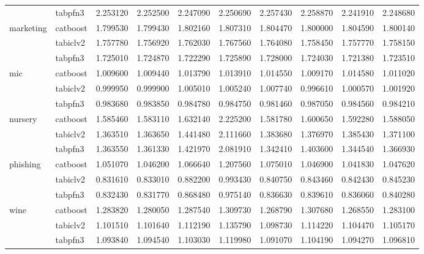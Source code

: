 \begin{table}
\begin{tabular}{llrrrrrrrr}
 & tabpfn3 & 2.253120 & 2.252500 & 2.247090 & 2.250690 & 2.257430 & 2.258870 & 2.241910 & 2.248680 \\
\cline{1-10}
\multirow[t]{3}{*}{marketing} & catboost & 1.799530 & 1.799430 & 1.802160 & 1.807310 & 1.804470 & 1.800000 & 1.804590 & 1.800140 \\
 & tabiclv2 & 1.757780 & 1.756920 & 1.762030 & 1.767560 & 1.764080 & 1.758450 & 1.757770 & 1.758150 \\
 & tabpfn3 & 1.725010 & 1.724870 & 1.722290 & 1.725890 & 1.728000 & 1.724030 & 1.721380 & 1.723510 \\
\cline{1-10}
\multirow[t]{3}{*}{mic} & catboost & 1.009600 & 1.009440 & 1.013790 & 1.013910 & 1.014550 & 1.009170 & 1.014580 & 1.011020 \\
 & tabiclv2 & 0.999950 & 0.999900 & 1.005010 & 1.005240 & 1.007740 & 0.996610 & 1.000570 & 1.001920 \\
 & tabpfn3 & 0.983680 & 0.983850 & 0.984780 & 0.984750 & 0.981460 & 0.987050 & 0.984560 & 0.984210 \\
\cline{1-10}
\multirow[t]{3}{*}{nursery} & catboost & 1.585460 & 1.583110 & 1.632140 & 2.225200 & 1.581780 & 1.600650 & 1.592280 & 1.588050 \\
 & tabiclv2 & 1.363510 & 1.363650 & 1.441480 & 2.111660 & 1.383680 & 1.376970 & 1.385430 & 1.371100 \\
 & tabpfn3 & 1.363550 & 1.361330 & 1.421970 & 2.081910 & 1.342410 & 1.403600 & 1.344540 & 1.366930 \\
\cline{1-10}
\multirow[t]{3}{*}{phishing} & catboost & 1.051070 & 1.046200 & 1.066640 & 1.207560 & 1.075010 & 1.046900 & 1.041830 & 1.047620 \\
 & tabiclv2 & 0.831610 & 0.833010 & 0.882200 & 0.993430 & 0.840750 & 0.843460 & 0.842430 & 0.845230 \\
 & tabpfn3 & 0.832430 & 0.831770 & 0.868480 & 0.975140 & 0.836630 & 0.839610 & 0.836060 & 0.840280 \\
\cline{1-10}
\multirow[t]{3}{*}{wine} & catboost & 1.283820 & 1.280050 & 1.287540 & 1.309730 & 1.268790 & 1.307680 & 1.268550 & 1.283100 \\
 & tabiclv2 & 1.101510 & 1.101640 & 1.112190 & 1.135790 & 1.098730 & 1.114220 & 1.104470 & 1.105170 \\
 & tabpfn3 & 1.093840 & 1.094540 & 1.103030 & 1.119980 & 1.091070 & 1.104190 & 1.094270 & 1.096810 \\
\cline{1-10}
\bottomrule
\end{tabular}
\end{table}
